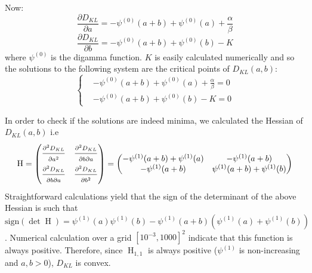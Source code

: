 \documentclass[12pt]{article}
\begin{document}
\begin{appendices}
	Now:
	\begin{equation}
	\frac{\partial D_{KL}}{\partial a} = -\psi^{(0)}(a+b) + \psi^{(0)}(a) + \frac{\alpha}{\beta}
	\end{equation}
	\begin{equation}
	\frac{\partial D_{KL}}{\partial b} = -\psi^{(0)}(a+b) + \psi^{(0)}(b) - K 
	\end{equation}
	where $\psi^{(0)}$ is the digamma function.
	$K$ is easily calculated numerically and so the solutions to the following system are the critical points of $D_{KL}(a,b)$:
	\[	\begin{cases}
	& -\psi^{(0)}(a+b) + \psi^{(0)}(a) + \frac{\alpha}{\beta} = 0 \\
	& -\psi^{(0)}(a+b) + \psi^{(0)}(b) - K  = 0
	\end{cases}\]
	
	In order to check if the solutions are indeed minima, we calculated the Hessian of $D_{KL}(a, b)$ i.e
	\begin{equation*}
	\text{H} = \begin{pmatrix}
	\frac{\strut \partial^2 D_{KL}}{\strut \partial a^2} & \frac{\strut \partial^2 D_{KL}}{\strut \partial b \partial a} \\
	\frac{\strut \partial^2 D_{KL}}{\strut \partial b \partial a} & \frac{\strut \partial^2 D_{KL}}{\strut \partial b^2} 
	\end{pmatrix} =
	\begin{pmatrix}
	-\psi^{(1)}(a+b) + \psi^{(1)}(a) & -\psi^{(1)}(a+b) \\
	-\psi^{(1)}(a+b) & \psi^{(1)}(a+b) + \psi^{(1)}(b)
	\end{pmatrix}
	\end{equation*}
	Straightforward calculations yield that the sign of the determinant of the above Hessian is such that $\text{sign}(\det{\operatorname{H}}) = \psi^{(1)}(a)\psi^{(1)}(b) - \psi^{(1)}(a+b)(\psi^{(1)}(a)+\psi^{(1)}(b))$.
	Numerical calculation over a grid $[10^{-3}, 1000]^2$ indicate that this function is always positive. Therefore, since $\operatorname{H}_{1,1}$ is always positive ($\psi^{(1)}$ is non-increasing and $a, b > 0$), $D_{KL}$ is convex.
\end{appendices}
	
\end{document}
